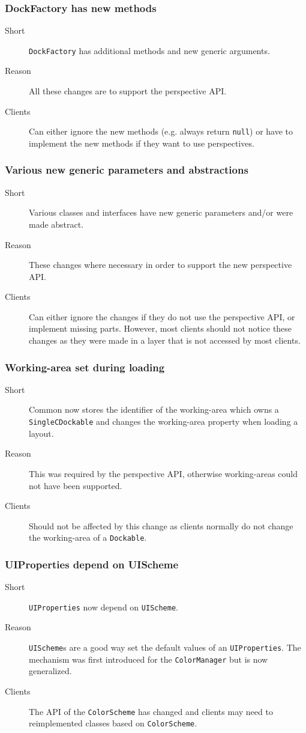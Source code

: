 \documentclass[a4paper,10pt]{article}
\newcommand{\src}[1]{\lstinline[basicstyle=\normalsize\ttfamily,keywordstyle=\normalsize\ttfamily,identifierstyle=\normalsize\ttfamily]|#1|}
\newcommand{\short}{\item[Short]}
\newcommand{\why}{\item[Reason]}
\newcommand{\clients}{\item[Clients]}
\begin{document}
\subsubsection{DockFactory has new methods}
\begin{description}
 \short \src{DockFactory} has additional methods and new generic arguments.
 \why All these changes are to support the perspective API.
 \clients Can either ignore the new methods (e.g. always return \src{null}) or have to implement the new methods if they want to use perspectives.
\end{description}

\subsubsection{Various new generic parameters and abstractions}
\begin{description}
 \short Various classes and interfaces have new generic parameters and/or were made abstract.
 \why These changes where necessary in order to support the new perspective API.
 \clients Can either ignore the changes if they do not use the perspective API, or implement missing parts. However, most clients should not notice these changes as they were made in a layer that is not accessed by most clients.
\end{description}

\subsubsection{Working-area set during loading}
\begin{description}
 \short Common now stores the identifier of the working-area which owns a \src{SingleCDockable} and changes the working-area property when loading a layout.
 \why This was required by the perspective API, otherwise working-areas could not have been supported.
 \clients Should not be affected by this change as clients normally do not change the working-area of a \src{Dockable}.
\end{description}

\subsubsection{UIProperties depend on UIScheme}
\begin{description}
 \short \src{UIProperties} now depend on \src{UIScheme}.
 \why \src{UIScheme}s are a good way set the default values of an \src{UIProperties}. The mechanism was first introduced for the \src{ColorManager} but is now generalized.
 \clients The API of the \src{ColorScheme} has changed and clients may need to reimplemented classes based on \src{ColorScheme}.
\end{description}
\end{document}
